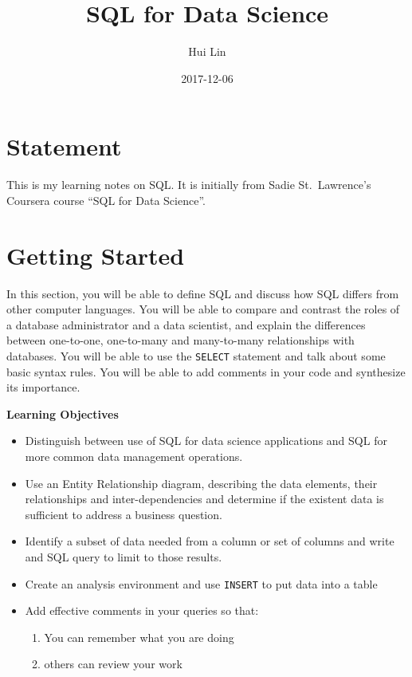 \documentclass[]{book}
\title{SQL for Data Science}
\author{Hui Lin}
\date{2017-12-06}
\providecommand{\tightlist}{%
  \setlength{\itemsep}{0pt}\setlength{\parskip}{0pt}}
\theoremstyle{definition}
\theoremstyle{definition}
\theoremstyle{remark}
\begin{document}
\maketitle

\thispagestyle{empty}
\begin{center}
\end{center}

\setlength{\abovedisplayskip}{-5pt}
\setlength{\abovedisplayshortskip}{-5pt}

{
\setcounter{tocdepth}{2}
\tableofcontents
}
\chapter*{Statement}\label{statement}


This is my learning notes on SQL. It is initially from Sadie
St.~Lawrence's Coursera course ``SQL for Data Science''.

\mainmatter

\chapter{Getting Started}\label{getting-started}

In this section, you will be able to define SQL and discuss how SQL
differs from other computer languages. You will be able to compare and
contrast the roles of a database administrator and a data scientist, and
explain the differences between one-to-one, one-to-many and many-to-many
relationships with databases. You will be able to use the
\texttt{SELECT} statement and talk about some basic syntax rules. You
will be able to add comments in your code and synthesize its importance.

\textbf{Learning Objectives}

\begin{itemize}
\tightlist
\item
  Distinguish between use of SQL for data science applications and SQL
  for more common data management operations.
\item
  Use an Entity Relationship diagram, describing the data elements,
  their relationships and inter-dependencies and determine if the
  existent data is sufficient to address a business question.
\item
  Identify a subset of data needed from a column or set of columns and
  write and SQL query to limit to those results.
\item
  Create an analysis environment and use \texttt{INSERT} to put data
  into a table
\item
  Add effective comments in your queries so that:

  \begin{enumerate}
  \def\labelenumi{\arabic{enumi}.}
  \tightlist
  \item
    You can remember what you are doing
  \item
    others can review your work
  \end{enumerate}
\end{itemize}
\end{document}
